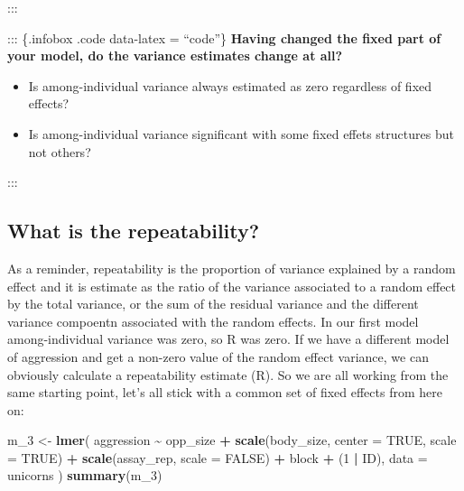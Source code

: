 \documentclass[
  12pt,
]{book}
\newenvironment{Shaded}{\begin{snugshade}}{\end{snugshade}}
\newcommand{\DataTypeTok}[1]{\textcolor[rgb]{0.13,0.29,0.53}{#1}}
\newcommand{\DecValTok}[1]{\textcolor[rgb]{0.00,0.00,0.81}{#1}}
\newcommand{\KeywordTok}[1]{\textcolor[rgb]{0.13,0.29,0.53}{\textbf{#1}}}
\newcommand{\NormalTok}[1]{#1}
\newcommand{\OperatorTok}[1]{\textcolor[rgb]{0.81,0.36,0.00}{\textbf{#1}}}
\newcommand{\OtherTok}[1]{\textcolor[rgb]{0.56,0.35,0.01}{#1}}
\newcommand{\StringTok}[1]{\textcolor[rgb]{0.31,0.60,0.02}{#1}}
\providecommand{\tightlist}{%
  \setlength{\itemsep}{0pt}\setlength{\parskip}{0pt}}
\begin{document}
:::

::: \{.infobox .code data-latex = ``code''\}
\textbf{Having changed the fixed part of your model, do the variance estimates change at all?}

\begin{itemize}
\tightlist
\item
  Is among-individual variance always estimated as zero regardless of fixed effects?
\item
  Is among-individual variance significant with some fixed effets structures but not others?
\end{itemize}

:::

\hypertarget{what-is-the-repeatability}{%
\subsection{What is the repeatability?}\label{what-is-the-repeatability}}

As a reminder, repeatability is the proportion of variance explained by a random effect and it is estimate as the ratio of the variance associated to a random effect by the total variance, or the sum of the residual variance and the different variance compoentn associated with the random effects.
In our first model among-individual variance was zero, so R was zero. If we have a different model of aggression and get a non-zero value of the random effect variance, we can obviously calculate a repeatability estimate (R). So we are all working from the same starting point, let's all stick with a common set of fixed effects from here on:

\begin{Shaded}
\begin{Highlighting}[]
\NormalTok{m\_}\DecValTok{3}\NormalTok{ \textless{}{-}}\StringTok{ }\KeywordTok{lmer}\NormalTok{(}
\NormalTok{  aggression }\OperatorTok{\textasciitilde{}}\StringTok{ }\NormalTok{opp\_size }\OperatorTok{+}\StringTok{ }\KeywordTok{scale}\NormalTok{(body\_size, }\DataTypeTok{center =} \OtherTok{TRUE}\NormalTok{, }\DataTypeTok{scale =} \OtherTok{TRUE}\NormalTok{)}
    \OperatorTok{+}\StringTok{ }\KeywordTok{scale}\NormalTok{(assay\_rep, }\DataTypeTok{scale =} \OtherTok{FALSE}\NormalTok{) }\OperatorTok{+}\StringTok{ }\NormalTok{block}
    \OperatorTok{+}\StringTok{ }\NormalTok{(}\DecValTok{1} \OperatorTok{|}\StringTok{ }\NormalTok{ID),}
  \DataTypeTok{data =}\NormalTok{ unicorns}
\NormalTok{)}
\KeywordTok{summary}\NormalTok{(m\_}\DecValTok{3}\NormalTok{)}
\end{Highlighting}
\end{Shaded}
\end{document}
